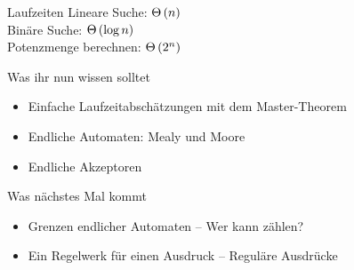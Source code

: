 
\begin{frame}{Laufzeiten}
	\pause
	Lineare Suche: \pause $\Theta\left(n\right)$ \\
	Binäre Suche:  \pause $\Theta\left(\log n\right)$ \\
	Potenzmenge berechnen: \pause $\Theta\left(2^n\right)$
\end{frame}







\begin{frame}	
	\begin{block}{Was ihr nun wissen solltet}
		\begin{itemize}
			\item Einfache Laufzeitabschätzungen mit dem Master-Theorem
			\item Endliche Automaten: Mealy und Moore
			\item Endliche Akzeptoren
		\end{itemize}
	\end{block}
	
	\begin{block}{Was nächstes Mal kommt}
		\begin{itemize}
			\item Grenzen endlicher Automaten -- Wer kann zählen?
			\item Ein Regelwerk für einen Ausdruck -- Reguläre Ausdrücke
		\end{itemize}
	\end{block}
\end{frame}

\slideThanks

